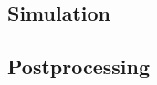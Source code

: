 \subsection{Simulation\label{openfoam:section:Simulation}}
\subsection{Postprocessing\label{openfoam:section:Postprocessing}}


